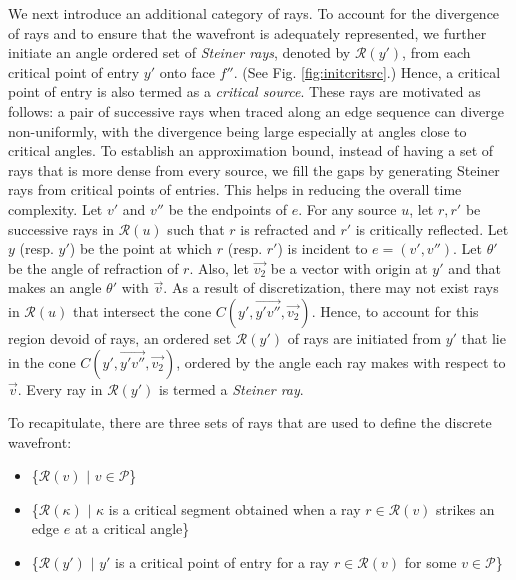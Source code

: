 \documentclass[11pt]{article}
\def\calP{\mathcal{P}}
\def\calR{\mathcal{R}}
\begin{document}
We next introduce an additional category of rays. To account for the divergence of rays and to ensure that
the wavefront is adequately represented, we further initiate an angle ordered set of {\it Steiner rays}, denoted by $\calR(y')$, from each critical point of entry $y'$ onto face $f''$. 
(See Fig. \ref{fig:initcritsrc}.)
Hence, a critical point of entry is also termed as a {\it critical source}.
These rays are motivated as follows: a pair of successive rays when traced along an edge sequence can diverge non-uniformly, with the divergence being large especially at angles close to critical angles.
To establish an approximation bound, instead of having a set of rays that is more dense from every source, we fill the gaps by generating Steiner rays from critical points of entries.
This helps in reducing the overall time complexity.
Let $v'$ and $v''$ be the endpoints of $e$.
For any source $u$, let $r, r'$ be successive rays in $\calR(u)$ such that $r$ is refracted and $r'$ is critically reflected.
Let $y$ (resp. $y'$) be the point at which $r$ (resp. $r'$) is incident to $e=(v', v'')$.
Let $\theta'$ be the angle of refraction of $r$.
Also, let $\overrightarrow{v_2}$ be a vector with origin at $y'$ and that makes an angle $\theta'$ with $\overrightarrow{v}$. 
As a result of discretization, there may not exist rays in $\calR(u)$ that intersect the cone $C(y',\overrightarrow{y'v''}, \overrightarrow{v_2})$.
Hence, to account for this region devoid of rays, an ordered set $\calR(y')$ of rays are initiated from $y'$ that lie in the cone $C(y',\overrightarrow{y'v''}, \overrightarrow{v_2})$, ordered by the angle each ray makes with respect to $\overrightarrow{v}$. 
Every ray in $\calR(y')$ is termed a {\it Steiner ray}.

To recapitulate, there are three sets  of rays that are used to define the discrete wavefront:
\begin{itemize}
\item \{$\calR(v)$ \hspace{0.005in} $|$ \hspace{0.005in} $v \in \calP$\}
\item \{$\calR(\kappa)$ \hspace{0.005in} $|$ \hspace{0.005in} $\kappa $ is a critical segment obtained  when a ray  $r \in \calR(v)$ strikes an edge $e$ at a critical angle\} 
\item \{$\calR(y')$ \hspace{0.005in} $|$ \hspace{0.005in} $y'$ is a critical point of entry for a ray $r \in \calR(v)$ for some $v \in \calP$\}
\end{itemize}
\end{document}
